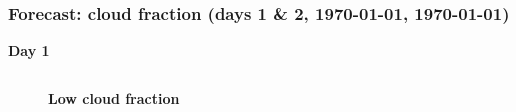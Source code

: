 \documentclass[aspectratio=169, 10pt]{beamer}
\begin{document}
\begin{frame}
\frametitle{Forecast: cloud fraction (days 1 \& 2, {\AdvanceDate[+1]\today}, {\AdvanceDate[+2]\today})}
\vspace{-.4cm}
\begin{center}
\textbf{Day 1} 
\end{center}
\vspace{-.75cm}

\begin{columns}
\begin{column}{0.33\textwidth}
\begin{figure}
\textbf{\tiny Low cloud fraction} \\
\end{figure}
\end{column}


\end{columns}
\end{frame}
\end{document}
